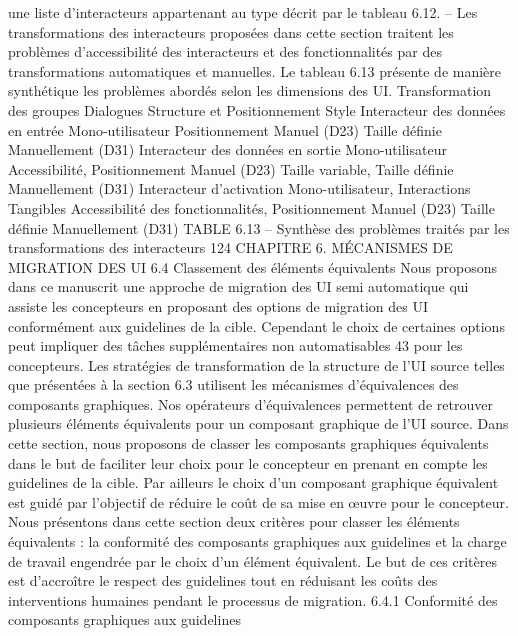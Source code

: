 \documentclass{article}
\begin{document}
une liste d’interacteurs appartenant au type d\'{e}crit par le tableau 6.12.
– Les transformations des interacteurs propos\'{e}es dans cette section traitent les probl\`{e}mes d’accessibilit\'{e} des interacteurs et des fonctionnalit\'{e}s par des transformations automatiques et manuelles. Le tableau 6.13 pr\'{e}sente de mani\`{e}re synth\'{e}tique les probl\`{e}mes abord\'{e}s selon les dimensions des UI.
Transformation des
groupes
Dialogues
Structure et
Positionnement
Style
Interacteur des
donn\'{e}es en entr\'{e}e
Mono-utilisateur
Positionnement
Manuel (D23)
Taille d\'{e}ﬁnie
Manuellement (D31)
Interacteur des
donn\'{e}es en sortie
Mono-utilisateur
Accessibilit\'{e},
Positionnement
Manuel (D23)
Taille variable, Taille
d\'{e}ﬁnie Manuellement
(D31)
Interacteur
d’activation
Mono-utilisateur,
Interactions Tangibles
Accessibilit\'{e} des
fonctionnalit\'{e}s,
Positionnement
Manuel (D23)
Taille d\'{e}ﬁnie
Manuellement (D31)
TABLE 6.13 – Synth\`{e}se des probl\`{e}mes trait\'{e}s par les transformations des interacteurs
124
CHAPITRE 6. MÉCANISMES DE MIGRATION DES UI
6.4
Classement des \'{e}l\'{e}ments \'{e}quivalents
Nous proposons dans ce manuscrit une approche de migration des UI semi automatique qui assiste les concepteurs en proposant des options de migration des UI conform\'{e}ment aux guidelines
de la cible. Cependant le choix de certaines options peut impliquer des t\^{a}ches suppl\'{e}mentaires non
automatisables 43 pour les concepteurs.
Les strat\'{e}gies de transformation de la structure de l’UI source telles que pr\'{e}sent\'{e}es \`{a} la section 6.3
utilisent les m\'{e}canismes d’\'{e}quivalences des composants graphiques. Nos op\'{e}rateurs d’\'{e}quivalences
permettent de retrouver plusieurs \'{e}l\'{e}ments \'{e}quivalents pour un composant graphique de l’UI source.
Dans cette section, nous proposons de classer les composants graphiques \'{e}quivalents dans le but de
faciliter leur choix pour le concepteur en prenant en compte les guidelines de la cible. Par ailleurs le
choix d’un composant graphique \'{e}quivalent est guid\'{e} par l’objectif de r\'{e}duire le co\^{u}t de sa mise en
œuvre pour le concepteur.
Nous pr\'{e}sentons dans cette section deux crit\`{e}res pour classer les \'{e}l\'{e}ments \'{e}quivalents : la conformit\'{e} des composants graphiques aux guidelines et la charge de travail engendr\'{e}e par le choix d’un
\'{e}l\'{e}ment \'{e}quivalent. Le but de ces crit\`{e}res est d’accro\^{i}tre le respect des guidelines tout en r\'{e}duisant les
co\^{u}ts des interventions humaines pendant le processus de migration.
6.4.1
Conformit\'{e} des composants graphiques aux guidelines
\end{document}
